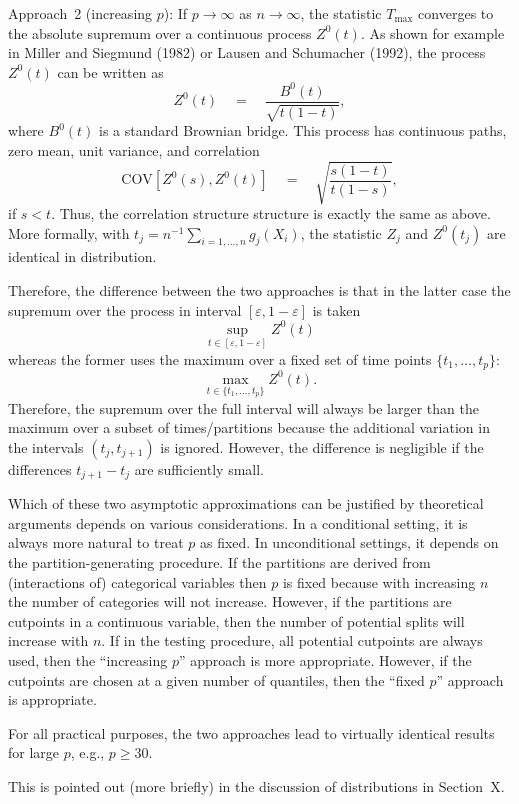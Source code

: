 \documentclass[11pt,a4paper]{article}
\begin{document}
\begin{enumerate}
	Approach~2 (increasing $p$): If $p \rightarrow \infty$ as $n \rightarrow \infty$,
	the statistic $T_{\max}$ converges to the absolute supremum over a continuous process
	$Z^0(t)$. As shown for example in Miller and Siegmund (1982) or
	Lausen and Schumacher (1992), the process $Z^0(t)$ can be written as
	  \[ Z^0(t) \quad = \quad \frac{B^0(t)}{\sqrt{t (1 - t)}}, \]
	where $B^0(t)$ is a standard Brownian bridge. This process has continuous paths,
	zero mean, unit variance, and correlation
	  \[ \mbox{COV}[Z^0(s), Z^0(t)] \quad = \quad \sqrt{\frac{s (1 - t)}{t (1 - s)}}, \]
	if $s < t$. Thus, the correlation structure structure is exactly the same as
	above. More formally, with $t_j = n^{-1} \sum_{i = 1, \dots, n} g_j(X_i)$,
	the statistic $Z_j$ and $Z^0(t_j)$ are identical in distribution.
	
	Therefore, the difference between the two approaches is that in the latter case
	the supremum over the process in interval $[\varepsilon, 1 - \varepsilon]$ is taken
	  \[ \sup_{t \in [\varepsilon, 1 - \varepsilon]} Z^0(t) \]
	whereas the former uses the maximum over a fixed set of time points
	$\{t_1, \dots, t_p\}$:	
	  \[ \max_{t \in \{t_1, \dots, t_p\}} Z^0(t). \]
	Therefore, the supremum over the full interval will always be larger than the 
	maximum over a subset of times/partitions because the additional variation
	in the intervals $(t_j, t_{j + 1})$ is ignored. However, the difference is negligible
	if the differences $t_{j+1} - t_j$ are sufficiently small.
	
	Which of these two asymptotic approximations can be justified by theoretical arguments
	depends on various considerations. In a conditional setting, it is always more natural
	to treat $p$ as fixed. In unconditional settings, it depends on the partition-generating
	procedure. If the partitions are derived from (interactions of) categorical variables
	then $p$ is fixed because with increasing $n$ the number of categories will not increase.
	However, if the partitions are cutpoints in a continuous variable, then the number
	of potential splits will increase with $n$. If in the testing procedure, all potential
	cutpoints are always used, then the ``increasing $p$'' approach is more appropriate.
	However, if the cutpoints are chosen at a given number of quantiles, then the ``fixed $p$''
	approach is appropriate.
	
	For all practical purposes, the two approaches lead to virtually identical results for
	large $p$, e.g., $p \ge 30$.
	
	This is pointed out (more briefly) in the discussion of distributions in Section~X.
		

\end{enumerate}
\end{document}
